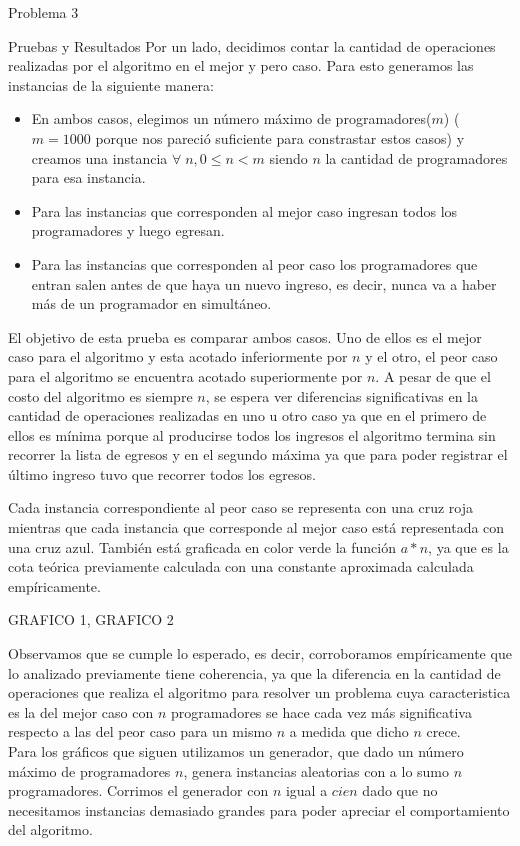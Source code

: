 \begin{section}{Problema 3}
\begin{subsection}{Pruebas y Resultados}
	Por un lado, decidimos contar la cantidad de operaciones realizadas por el algoritmo en el mejor y pero caso. Para esto generamos las instancias de la siguiente manera:
	\begin{itemize}
		\item En ambos casos, elegimos un número máximo de programadores($m$) ($m=1000$ porque nos pareció suficiente para constrastar estos casos) y creamos una instancia $\forall\;n,0\leq n < m$ siendo $n$ la cantidad de programadores para esa instancia.
		\item Para las instancias que corresponden al mejor caso ingresan todos los programadores y luego egresan.
		\item Para las instancias que corresponden al peor caso los programadores que entran salen antes de que haya un nuevo ingreso, es decir, nunca va a haber más de un programador en simultáneo.
	\end{itemize}

	El objetivo de esta prueba es comparar ambos casos. Uno de ellos es el mejor caso para el algoritmo y esta acotado inferiormente por $n$ y el otro, el peor caso para el algoritmo se encuentra acotado superiormente por $n$. A pesar de que el costo del algoritmo es siempre $n$, se espera ver diferencias significativas en la cantidad de operaciones realizadas en uno u otro caso ya que en el primero de ellos es mínima porque al producirse todos los ingresos el algoritmo termina sin recorrer la lista de egresos y en el segundo máxima ya que para poder registrar el último ingreso tuvo que recorrer todos los egresos.
	
	Cada instancia correspondiente al peor caso se representa con una cruz roja mientras que cada instancia que corresponde al mejor caso está representada con una cruz azul. También está graficada en color verde la función $a*n$, ya que es la cota teórica previamente calculada con una constante aproximada calculada empíricamente.
	
	GRAFICO 1, GRAFICO 2

	Observamos que se cumple lo esperado, es decir, corroboramos empíricamente que lo analizado previamente tiene coherencia, ya que la diferencia en la cantidad de operaciones que realiza el algoritmo para resolver un problema cuya caracteristica es la del mejor caso con $n$ programadores se hace cada vez más significativa respecto a las del peor caso para un mismo $n$ a medida que dicho $n$ crece.\\
	
	Para los gráficos que siguen utilizamos un generador, que dado un número máximo de programadores $n$, genera instancias aleatorias con a lo sumo $n$ programadores. Corrimos el generador con $n$ igual a $cien$ dado que no necesitamos instancias demasiado grandes para poder apreciar el comportamiento del algoritmo.


\end{subsection}
\end{section}
